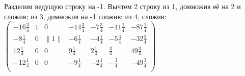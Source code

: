 \documentclass[a4paper,14pt]{extarticle}
\begin{document}
Разделим ведущую строку на -1. Вычтем 2 строку из 1, домножив её на 2 и сложив; из 3, домножив на -1 сложив; из 4, сложив:\bigbreak
$\begin{pmatrix}
        -16\frac{3}{4} & 1 & 0     & -14\frac{3}{4} & -7\frac{3}{4} & -11\frac{1}{4} & -87\frac{1}{4} \\
        -8\frac{1}{4}  & 0 & \|1\| & -6\frac{1}{4}  & -4\frac{1}{4} & -5\frac{3}{4}  & -32\frac{3}{4} \\
        12\frac{1}{4}  & 0 & 0     & 9\frac{1}{4}   & 2\frac{1}{4}  & \frac{3}{4}    & 49\frac{3}{4}  \\
        -12\frac{1}{4} & 0 & 0     & -9\frac{1}{4}  & -2\frac{1}{4} & -\frac{3}{4}   & -49\frac{3}{4} \\
    \end{pmatrix}$\bigbreak
\end{document}
